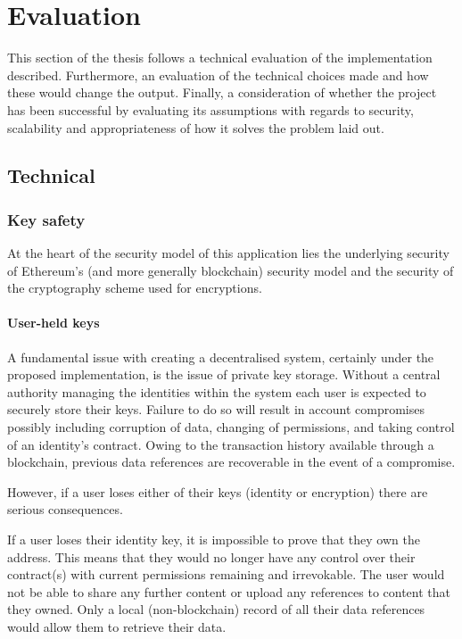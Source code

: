 \section{Evaluation}

This section of the thesis follows a technical evaluation of the implementation described. Furthermore, an evaluation of the technical choices made and how these would change the output. Finally, a consideration of whether the project has been successful by evaluating its assumptions with regards to security, scalability and appropriateness of how it solves the problem laid out.

\subsection{Technical}

\subsubsection{Key safety}

At the heart of the security model of this application lies the underlying security of Ethereum's (and more generally blockchain) security model and the security of the cryptography scheme used for encryptions.

\paragraph{User-held keys}

A fundamental issue with creating a decentralised system, certainly under the proposed implementation, is the issue of private key storage. Without a central authority managing the identities within the system each user is expected to securely store their keys. Failure to do so will result in account compromises possibly including corruption of data, changing of permissions, and taking control of an identity's contract. Owing to the transaction history available through a blockchain, previous data references are recoverable in the event of a compromise.

However, if a user loses either of their keys (identity or encryption) there are serious consequences.

If a user loses their identity key, it is impossible to prove that they own the address. This means that they would no longer have any control over their contract(s) with current permissions remaining and irrevokable. The user would not be able to share any further content or upload any references to content that they owned. Only a local (non-blockchain) record of all their data references would allow them to retrieve their data.

